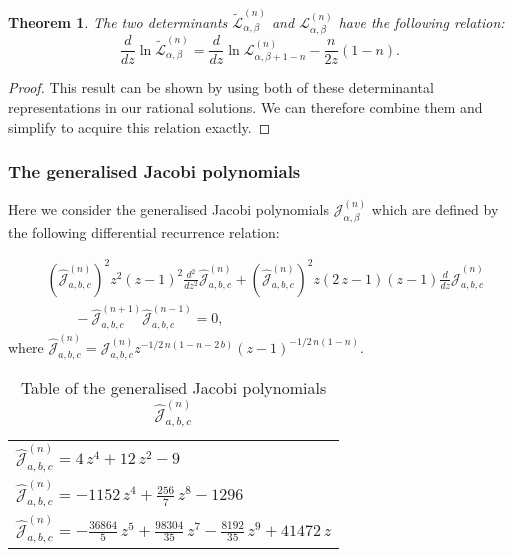 \documentclass[12pt]{article}
\def\L{\mathcal{L}}
\def\J{\mathcal{J}}
\newtheorem{mydef}{Theorem}[section]
\numberwithin{figure}{section}
\numberwithin{equation}{section}
\numberwithin{table}{section}
\begin{document}
\begin{mydef}
The two determinants $\widetilde{\L}_{\alpha,\beta}^{(n)}$ and ${\L}_{\alpha,\beta}^{(n)}$ have the following relation:
\begin{equation}
\frac{d}{dz}\ln\widetilde{\L}_{\alpha,\beta}^{(n)}=\frac{d}{dz}\ln{\L}_{\alpha,\beta+1-n}^{(n)}-\frac{n}{2z}\left(1-n\right).\label{c2}
\end{equation}
\end{mydef}
\begin{proof}
This result can be shown by using both of these determinantal representations in our rational solutions. We can therefore combine them and simplify to acquire this relation exactly.
\end{proof}
\subsubsection{The generalised Jacobi polynomials}
Here we consider the generalised Jacobi polynomials $\J_{\alpha,\beta}^{(n)}$ which are defined by the following differential recurrence relation:

\begin{align}\nonumber
&\left( \widehat{\J}_{a,b,c}^{(n)}  \right) ^{2}{z}^{2} \left( z-1
 \right) ^{2}\frac{d^2}{dz^2}\widehat{\J}_{a,b,c}^{(n)} +
 \left( \widehat{\J}_{a,b,c}^{(n)} \right) ^{2}z \left( 2\,z-1
 \right)  \left( z-1 \right) \frac{d}{dz}\widehat{\J}_{a,b,c}^{(n)}\\&\qquad  -\widehat{\J}_{a,b,c}^{(n+1)} \widehat{\J}_{a,b,c}^{(n-1)}
=0,\label{JDDR}
\end{align}
where $\widehat{\J}_{a,b,c}^{(n)}=\J_{a,b,c}^{(n)}{z}^{-1/2\,n \left( 1-n-2\,b \right) }
 \left( z-1 \right) ^{-1/2\,n \left( 1-n \right)}$.
 \begin{table}[!htb]
\centering\caption{Table of the generalised Jacobi polynomials $\widehat{\J}_{a,b,c}^{(n)}$} %
\centering
\begin{tabular}{l}
\hline
$\widehat{\J}_{a,b,c}^{(n)}=4\,{z}^{4}+12\,{z}^{2}-9$\\
$\widehat{\J}_{a,b,c}^{(n)}=-1152\,{z}^{4}+{\frac {256}{7}}\,{z}^{8}-1296$\\
$\widehat{\J}_{a,b,c}^{(n)}=-{\frac {36864}{5}}\,{z}^{5}+{\frac {98304}{35}}\,{z}^{7}-{\frac {8192
}{35}}\,{z}^{9}+41472\,z$\\
\hline
\end{tabular}
\label{table:nonlin}
\end{table}
\end{document}
